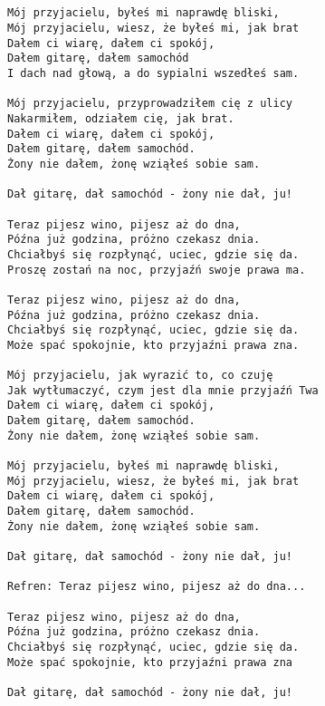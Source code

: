 \documentclass[12pt]{article}
\begin{document}
\subsection*{}
\begin{verbatim}
Mój przyjacielu, byłeś mi naprawdę bliski,
Mój przyjacielu, wiesz, że byłeś mi, jak brat
Dałem ci wiarę, dałem ci spokój,
Dałem gitarę, dałem samochód
I dach nad głową, a do sypialni wszedłeś sam.

Mój przyjacielu, przyprowadziłem cię z ulicy
Nakarmiłem, odziałem cię, jak brat.
Dałem ci wiarę, dałem ci spokój,
Dałem gitarę, dałem samochód.
Żony nie dałem, żonę wziąłeś sobie sam.

Dał gitarę, dał samochód - żony nie dał, ju!

Teraz pijesz wino, pijesz aż do dna,
Późna już godzina, próżno czekasz dnia.
Chciałbyś się rozpłynąć, uciec, gdzie się da.
Proszę zostań na noc, przyjaźń swoje prawa ma.

Teraz pijesz wino, pijesz aż do dna,
Późna już godzina, próżno czekasz dnia.
Chciałbyś się rozpłynąć, uciec, gdzie się da.
Może spać spokojnie, kto przyjaźni prawa zna.

Mój przyjacielu, jak wyrazić to, co czuję
Jak wytłumaczyć, czym jest dla mnie przyjaźń Twa
Dałem ci wiarę, dałem ci spokój,
Dałem gitarę, dałem samochód.
Żony nie dałem, żonę wziąłeś sobie sam.

Mój przyjacielu, byłeś mi naprawdę bliski,
Mój przyjacielu, wiesz, że byłeś mi, jak brat
Dałem ci wiarę, dałem ci spokój,
Dałem gitarę, dałem samochód.
Żony nie dałem, żonę wziąłeś sobie sam.

Dał gitarę, dał samochód - żony nie dał, ju!

Refren: Teraz pijesz wino, pijesz aż do dna...

Teraz pijesz wino, pijesz aż do dna,
Późna już godzina, próżno czekasz dnia.
Chciałbyś się rozpłynąć, uciec, gdzie się da.
Może spać spokojnie, kto przyjaźni prawa zna

Dał gitarę, dał samochód - żony nie dał, ju!
\end{verbatim}
\clearpage
\end{document}

